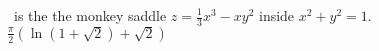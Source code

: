 {\surfaceS\ is the the monkey saddle $z = \frac{1}{3}x^3-xy^2$ inside $x^2 + y^2 = 1$.
}
{$\frac{\pi}{2} \left(\ln{\left (1 + \sqrt{2} \right )} + \sqrt{2}\right)$}
